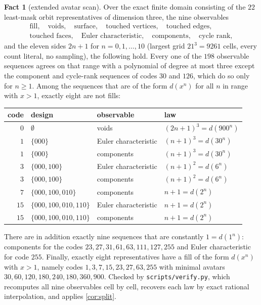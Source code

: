 \documentclass[11pt]{amsart}
\theoremstyle{definition}
\newtheorem{fact}[theorem]{Fact}
\theoremstyle{remark}
\begin{document}
\begin{fact}[extended avatar scan]
\label{fact:scan}
Over the exact finite domain consisting of the $22$ least-mask orbit representatives of dimension three, the nine observables
\begin{gather*}
  \text{fill},\quad \text{voids},\quad \text{surface},\quad \text{touched vertices},\quad \text{touched edges},\\
  \text{touched faces},\quad \text{Euler characteristic},\quad \text{components},\quad \text{cycle rank},
\end{gather*}
and the eleven sides $2n+1$ for $n=0,1,\dots,10$ (largest grid $21^{3} = 9261$ cells, every count literal, no sampling), the following hold. Every one of the $198$ observable sequences agrees on that range with a polynomial of degree at most three except the component and cycle-rank sequences of codes $30$ and $126$, which do so only for $n \ge 1$. Among the sequences that are of the form $d(x^{n})$ for all $n$ in range with $x>1$, exactly eight are not fills:
\begin{center}
\begin{tabular}{rlll}
\toprule
code & design & observable & law \\
\midrule
$0$  & $\emptyset$ & voids & $(2n+1)^{3} = d(900^{n})$\\
$1$  & $\{000\}$ & Euler characteristic & $(n+1)^{3} = d(30^{n})$\\
$1$  & $\{000\}$ & components & $(n+1)^{3} = d(30^{n})$\\
$3$  & $\{000,100\}$ & Euler characteristic & $(n+1)^{2} = d(6^{n})$\\
$3$  & $\{000,100\}$ & components & $(n+1)^{2} = d(6^{n})$\\
$7$  & $\{000,100,010\}$ & components & $n+1 = d(2^{n})$\\
$15$ & $\{000,100,010,110\}$ & Euler characteristic & $n+1 = d(2^{n})$\\
$15$ & $\{000,100,010,110\}$ & components & $n+1 = d(2^{n})$\\
\bottomrule
\end{tabular}
\end{center}
There are in addition exactly nine sequences that are constantly $1 = d(1^{n})$: components for the codes $23, 27, 31, 61, 63, 111, 127, 255$ and Euler characteristic for code $255$. Finally, exactly eight representatives have a fill of the form $d(x^{n})$ with $x>1$, namely codes $1,3,7,15,23,27,63,255$ with minimal avatars $30,60,120,180,240,180,360,900$. Checked by \texttt{scripts/verify.py}, which recomputes all nine observables cell by cell, recovers each law by exact rational interpolation, and applies \cref{cor:split}.
\end{fact}
\end{document}
